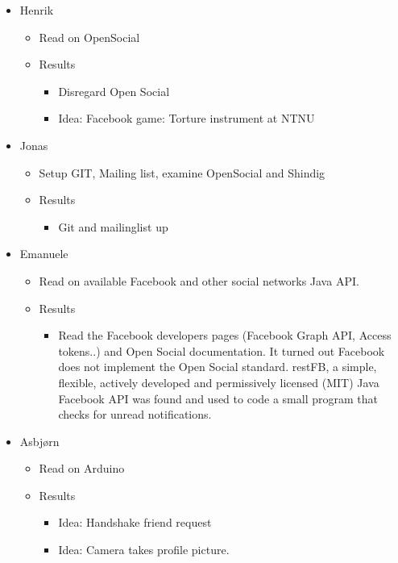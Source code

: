 \begin{itemize}
	\item Henrik
	\begin{itemize}
		\item Read on OpenSocial
		\item Results
		\begin{itemize}
			\item Disregard Open Social
			\item Idea: Facebook game: Torture instrument at NTNU
		\end{itemize}
	\end{itemize}

	\item Jonas
	\begin{itemize}
		\item Setup GIT, Mailing list, examine OpenSocial and Shindig
		\item Results
		\begin{itemize}
			\item Git and mailinglist up
		\end{itemize}
	\end{itemize}

	\item Emanuele
	\begin{itemize}
		\item Read on available Facebook and other social networks Java API.
		\item Results
		\begin{itemize}
			\item Read the Facebook developers pages (Facebook Graph API, Access tokens..)
and Open Social documentation. It turned out Facebook does not implement the Open Social standard. restFB, a simple, flexible, actively developed and permissively licensed (MIT) Java Facebook API was found and used to code a small program that checks for unread notifications.
		\end{itemize}
	\end{itemize}

	\item Asbjørn
	\begin{itemize}
		\item Read on Arduino
		\item Results
		\begin{itemize}
			\item Idea: Handshake friend request
			\item Idea: Camera takes profile picture.
		\end{itemize}
	\end{itemize}


\end{itemize}
